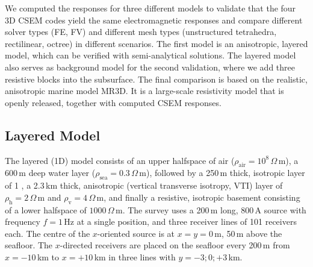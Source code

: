 \documentclass[a4paper, extra, camera,%
]{gji}
\begin{document}
We computed the responses for three different models to validate that the four 3D CSEM codes yield the same electromagnetic responses and compare different solver types (FE, FV) and different mesh types (unstructured tetrahedra, rectilinear, octree) in different scenarios. The first model is an anisotropic, layered model, which can be verified with semi-analytical solutions. The layered model also serves as background model for the second validation, where we add three resistive blocks into the subsurface. The final comparison is based on the realistic, anisotropic marine model MR3D. It is a large-scale resistivity model that is openly released, together with computed CSEM responses.

\subsection{Layered Model}

The layered (1D) model consists of an upper halfspace of air ($\rho_\text{air}=10^8\,\Omega\,\text{m}$), a 600\,m deep water layer ($\rho_\text{sea}=0.3\,\Omega\,\text{m}$), followed by a 250\,m thick, isotropic layer of 1\,\Omega\,, a 2.3\,km thick, anisotropic (vertical transverse isotropy, VTI) layer of $\rho_\text{h}=2\,\Omega\,\text{m}$ and $\rho_\text{v}=4\,\Omega\,\text{m}$, and finally a resistive, isotropic basement consisting of a lower halfspace of $1000\,\Omega\,\text{m}$. The survey uses a 200\,m long, 800\,A source  with frequency $f=1\,$Hz at a single position, and three receiver lines of 101 receivers each. The centre of the $x$-oriented source is at $x=y=0\,$m, 50\,m above the seafloor. The $x$-directed receivers are placed on the seafloor every 200\,m from $x=-10\,$km to $x=+10\,$km in three lines with $y=-3; 0; +3\,$km.
\end{document}
